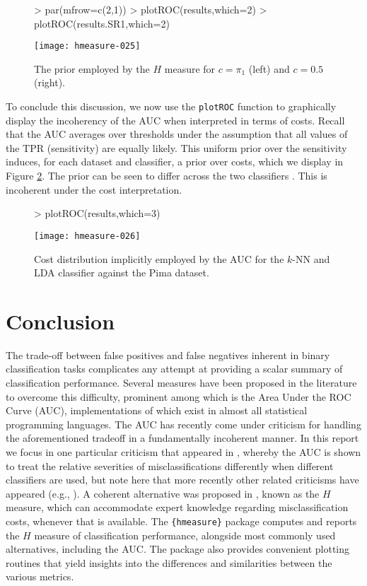 \documentclass{article}
\begin{document}
\begin{figure}
\centering
\begin{Schunk}
\begin{Sinput}
> par(mfrow=c(2,1))
> plotROC(results,which=2)
> plotROC(results.SR1,which=2)
\end{Sinput}
\end{Schunk}
\texttt{[image: hmeasure-025]}
\caption{\label{fig:H.cost.weights}The prior employed by the $H$ measure for $c=\pi_1$ (left) and $c=0.5$ (right).}
\end{figure}
To conclude this discussion, we now use the \verb+plotROC+ function to graphically display the incoherency of the AUC when interpreted in terms of costs. Recall that the AUC averages over thresholds under the assumption that all values of the TPR (sensitivity) are equally likely. This uniform prior over the sensitivity induces, for each dataset and classifier, a prior over costs, which we display in Figure \ref{fig:AUC}. The prior can be seen to differ across the two classifiers \cite{hand2009}. This is incoherent under the cost interpretation. 
\begin{figure}
\centering
\begin{minipage}{0.60\textwidth}
\begin{Schunk}
\begin{Sinput}
> plotROC(results,which=3)
\end{Sinput}
\end{Schunk}
\texttt{[image: hmeasure-026]}
\end{minipage}
\caption{\label{fig:AUC}Cost distribution implicitly employed by the AUC for the $k$-NN and LDA classifier against the Pima dataset.}
\end{figure}

\section{Conclusion}
The trade-off between false positives and false negatives inherent in binary classification tasks complicates any attempt at providing a scalar summary of classification performance. Several measures have been proposed in the literature to overcome this difficulty, prominent among which is the Area Under the ROC Curve (AUC), implementations of which exist in almost all statistical programming languages. The AUC has recently come under criticism for handling the aforementioned tradeoff in a fundamentally incoherent manner. In this report we focus in one particular criticism that appeared in \cite{hand2009}, whereby the AUC is shown to treat the relative severities of misclassifications differently when different classifiers are used, but note here that more recently other related criticisms have appeared (e.g., \cite{hand2011b}). A coherent alternative was proposed in \cite{hand2009}, known as the $H$ measure, which can  accommodate expert knowledge regarding misclassification costs, whenever that is available. The \verb+{hmeasure}+ package computes and reports the $H$ measure of classification performance, alongside most commonly used alternatives, including the AUC. The package also provides convenient plotting routines that yield insights into the differences and similarities between the various metrics. 
\end{document}
